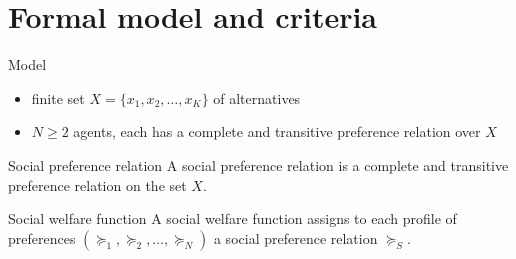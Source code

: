 \documentclass[bigger]{beamer}
\begin{document}
\section{Formal model and criteria}
\label{sec:orgbef9198}

\begin{frame}[label={sec:orgba292e2}]{Model}
\begin{itemize}
\item finite set \(X=\{x_1,x_2,\dots,x_K\}\) of alternatives
\item \(N\geq 2\) agents, each has a complete and transitive preference relation over \(X\)
\end{itemize}
\begin{block}{Social preference relation}
A social preference relation is a complete and transitive preference relation on the set \(X\).
\end{block}
\begin{block}{Social welfare function}
A social welfare function assigns to each profile of preferences \((\succeq_1,\succeq_2,\dots,\succeq_N)\) a social preference relation \(\succeq_S\).
\end{block}
\end{frame}
\end{document}
